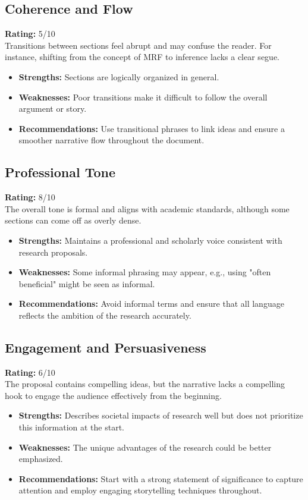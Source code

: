 \documentclass[11pt]{article}
\begin{document}
\subsection{Coherence and Flow}
\textbf{Rating:} 5/10 \\
Transitions between sections feel abrupt and may confuse the reader. For instance, shifting from the concept of MRF to inference lacks a clear segue. 
\begin{itemize}
    \item \textbf{Strengths:} Sections are logically organized in general.
    \item \textbf{Weaknesses:} Poor transitions make it difficult to follow the overall argument or story.
    \item \textbf{Recommendations:} Use transitional phrases to link ideas and ensure a smoother narrative flow throughout the document.
\end{itemize}

\subsection{Professional Tone}
\textbf{Rating:} 8/10 \\
The overall tone is formal and aligns with academic standards, although some sections can come off as overly dense.
\begin{itemize}
    \item \textbf{Strengths:} Maintains a professional and scholarly voice consistent with research proposals.
    \item \textbf{Weaknesses:} Some informal phrasing may appear, e.g., using "often beneficial" might be seen as informal.
    \item \textbf{Recommendations:} Avoid informal terms and ensure that all language reflects the ambition of the research accurately.
\end{itemize}

\subsection{Engagement and Persuasiveness}
\textbf{Rating:} 6/10 \\
The proposal contains compelling ideas, but the narrative lacks a compelling hook to engage the audience effectively from the beginning.
\begin{itemize}
    \item \textbf{Strengths:} Describes societal impacts of research well but does not prioritize this information at the start.
    \item \textbf{Weaknesses:} The unique advantages of the research could be better emphasized.
    \item \textbf{Recommendations:} Start with a strong statement of significance to capture attention and employ engaging storytelling techniques throughout.
\end{itemize}
\end{document}
